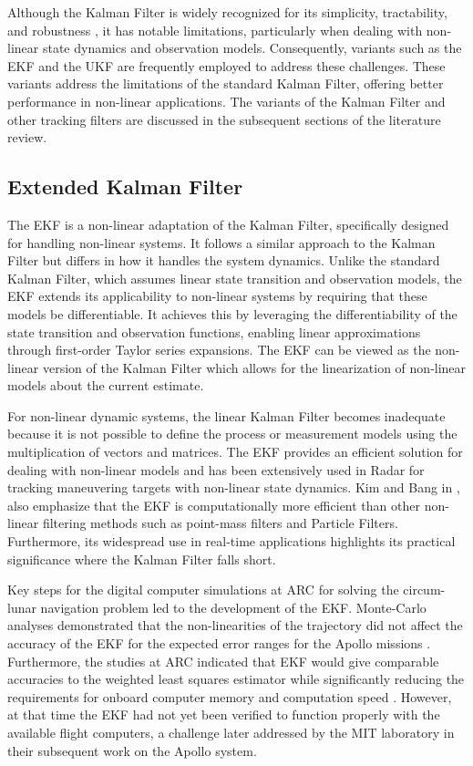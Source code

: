 Although the Kalman Filter is widely recognized for its simplicity, tractability, and robustness \cite{Julier1997a}, it has notable limitations, particularly when dealing with non-linear state dynamics and observation models. Consequently, variants such as the \ac{EKF} and the \ac{UKF} are frequently employed to address these challenges. These variants address the limitations of the standard Kalman Filter, offering better performance in non-linear applications. The variants of the Kalman Filter and other tracking filters are discussed in the subsequent sections of the literature review.

\subsection{Extended Kalman Filter}
The \ac{EKF} is a non-linear adaptation of the Kalman Filter, specifically designed for handling non-linear systems. It follows a similar approach to the Kalman Filter but differs in how it handles the system dynamics. Unlike the standard Kalman Filter, which assumes linear state transition and observation models, the \ac{EKF} extends its applicability to non-linear systems by requiring that these models be differentiable. It achieves this by leveraging the differentiability of the state transition and observation functions, enabling linear approximations through first-order Taylor series expansions\cite{Aditya}. The \ac{EKF} can be viewed as the non-linear version of the Kalman Filter which allows for the linearization of non-linear models about the current estimate. 

For non-linear dynamic systems, the linear Kalman Filter becomes inadequate because it is not possible to define the process or measurement models using the multiplication of vectors and matrices. The \ac{EKF} provides an efficient solution for dealing with non-linear models and has been extensively used in \ac{Radar} for tracking maneuvering targets with non-linear state dynamics. Kim and Bang in \cite{Kim}, also emphasize that the \ac{EKF} is computationally more efficient than other non-linear filtering methods such as point-mass filters and Particle Filters. Furthermore, its widespread use in real-time applications highlights its practical significance where the Kalman Filter falls short.

Key steps for the digital computer simulations at \ac{ARC} for solving the circum-lunar navigation problem led to the development of the \ac{EKF}. Monte-Carlo analyses demonstrated that the non-linearities of the trajectory did not affect the accuracy of the \ac{EKF} for the expected error ranges for the Apollo missions \cite{Andrews2010}. Furthermore, the studies at \ac{ARC} indicated that \ac{EKF} would give comparable accuracies to the weighted least squares estimator while significantly reducing the requirements for onboard computer memory and computation speed \cite{schmidt1981}. However, at that time the \ac{EKF} had not yet been verified to function properly with the available flight computers, a challenge later addressed by the \ac{MIT} laboratory in their subsequent work on the Apollo system.

